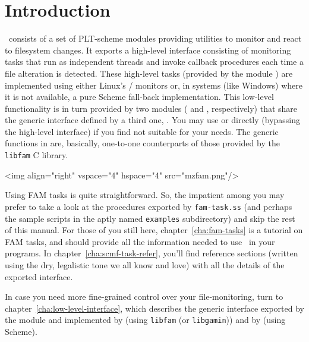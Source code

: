 
\chapter{Introduction}
\label{cha:introduction}

\MzFam\ consists of a set of PLT-scheme modules providing utilities to
monitor and react to filesystem changes. It exports a high-level
interface consisting of monitoring tasks that run as independent
threads and invoke callback procedures each time a file alteration is
detected. These high-level tasks (provided by the module
) are implemented using either Linux's
/
monitors or, in systems (like Windows) where it is not available, a
pure Scheme fall-back implementation. This low-level functionality is
in turn provided by two modules ( and ,
respectively) that share the generic interface defined by a third one,
. You may use  or  directly
(bypassing the high-level interface) if you find  not
suitable for your needs. The generic functions in  are,
basically, one-to-one counterparts of those provided by the
\texttt{libfam} C library.

\htmlonly
\rawhtml<img align="right" vspace="4" hspace="4" src="mzfam.png"/>\endrawhtml
\endhtmlonly

Using FAM tasks is quite straightforward. So, the impatient among you
may prefer to take a look at the procedures exported by
\texttt{fam-task.ss} (and perhaps the sample scripts in the aptly
named \texttt{examples} subdirectory) and skip the rest of this
manual. For those of you still here, chapter~\ref{cha:fam-tasks} is a
tutorial on FAM tasks, and should provide all the information
needed to use \MzFam\ in your programs. In
chapter~\ref{cha:scmf-task-refer}, you'll find reference sections
(written using the dry, legalistic tone we all know and love) with all
the details of the exported  interface.

In case you need more fine-grained control over your file-monitoring,
turn to chapter~\ref{cha:low-level-interface}, which describes the
generic interface exported by the  module and
implemented by  (using \texttt{libfam} (or
\texttt{libgamin})) and by  (using Scheme).

